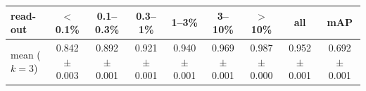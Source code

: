 \begin{tabular}{lcccccccc}
\toprule
read-out & $<$0.1\% & 0.1--0.3\% & 0.3--1\% & 1--3\% & 3--10\% & $>$10\% & all & mAP \\
\midrule
mean ($k=3$) & 0.842 $\pm$ 0.003 & 0.892 $\pm$ 0.001 & 0.921 $\pm$ 0.001 & 0.940 $\pm$ 0.001 & 0.969 $\pm$ 0.001 & 0.987 $\pm$ 0.000 & 0.952 $\pm$ 0.001 & 0.692 $\pm$ 0.001 \\
\bottomrule
\end{tabular}
